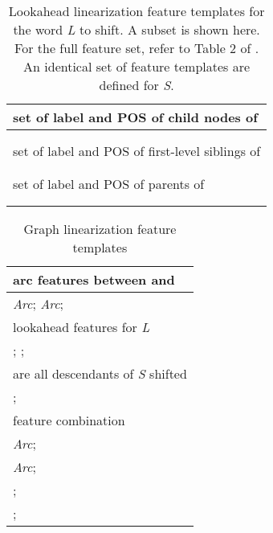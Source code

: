 \documentclass[11pt]{article}
\begin{document}
\begin{table}[t]
\centering
\footnotesize
\begin{tabularx}{.45\textwidth}{X}
\hline 
set of label and POS of child nodes of \\ 
\hline 
\\
\\
\hline 
\hline  
set of label and POS of first-level siblings of \\ 
\hline 
\\
\\
\hline 
\hline  
set of label and POS of parents of \\ 
\hline 
\\
\\
\hline 

\end{tabularx}
\caption{Lookahead linearization feature templates for the word {\it L} to shift. A subset is shown here. For the full feature set, refer to Table 2 of . An identical set of feature templates are defined for {\it S}.}
\label{tab:features-templates}
\end{table}


\begin{table}\centering
\footnotesize
\begin{tabularx}{.45\textwidth}{X}
\hline 
arc features between  and  \\
\hline
{\it Arc}; {\it Arc}; \\
\hline
\hline
lookahead features for {\it L} \\
\hline
; ; \\
\hline
\hline
are all descendants of {\it S} shifted\\
\hline
;\\
\hline
\hline
feature combination \\
\hline
{\it Arc}; \\
{\it Arc};\\
 ; \\
 ; \\
\hline 

\end{tabularx}
\caption{Graph linearization feature templates}
\label{tab:new-features-templates}
\end{table}
\end{document}
